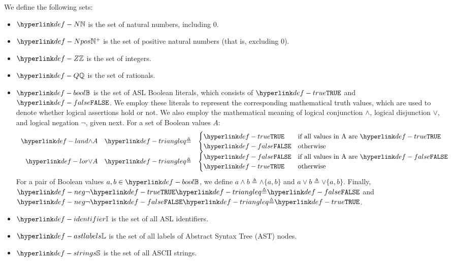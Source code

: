 We define the following sets:
\begin{itemize}
\item \hypertarget{def-N}{
    $\N$ is the set of natural numbers, including $0$.
}

\item \hypertarget{def-Npos}{
    $\Npos$ is the set of positive natural numbers (that is, excluding $0$).
}

\item
\hypertarget{def-Z}{
    $\Z$ is the set of integers.
}

\item
\hypertarget{def-Q}{
    $\Q$ is the set of rationals.
}

\hypertarget{def-bool}{}
\hypertarget{def-false}{}
\hypertarget{def-true}{}
\item $\Bool$ is the set of ASL Boolean literals, which consists of $\True$ and $\False$.
We employ these literals to represent the corresponding mathematical truth values,
which are used to denote whether logical assertions hold or not.
\hypertarget{def-land}{}
\hypertarget{def-lor}{}
We also employ the mathematical meaning of logical conjunction $\land$, logical disjunction $\lor$,
and logical negation $\neg$, given next.
For a set of Boolean values $A$:
\[
  \begin{array}{rcl}
  \land A &\triangleq&
  \begin{cases}
    \True & \text{if all values in A are }\True\\
    \False & \text{otherwise}
  \end{cases}\\
  \lor A &\triangleq&
  \begin{cases}
    \False & \text{if all values in A are }\False\\
    \True & \text{otherwise}
  \end{cases}\\
\end{array}
\]
\hypertarget{def-neg}{}
For a pair of Boolean values $a,b\in\Bool$, we define $a \land b \triangleq \land\{a, b\}$
and $a \lor b \triangleq \lor\{a, b\}$.
Finally, $\neg\True\triangleq\False$ and $\neg\False\triangleq\True$.

\item
\hypertarget{def-identifier}{}
    $\Identifiers$ is the set of all ASL identifiers.

\item
\hypertarget{def-astlabels}{}
    $\astlabels$ is the set of all labels of Abstract Syntax Tree (AST) nodes.

\item
\hypertarget{def-strings}{}
    $\Strings$ is the set of all ASCII strings.
\end{itemize}

